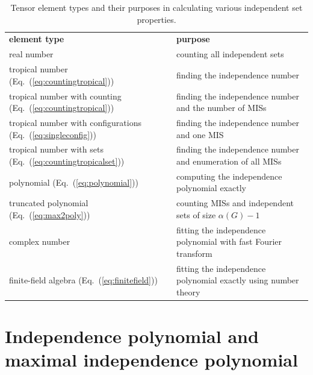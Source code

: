 \documentclass[onefignum, onetabnum]{siamart190516}
\newcommand{\<}{\langle}
\renewcommand{\>}{\rangle}
\newcommand{\Eq}[1]{Eq.~(\ref{#1})}
\newcommand{\ra}[1]{\renewcommand{\arraystretch}{#1}}
\begin{document}
\begin{table}[t!]\centering
\begin{minipage}{\columnwidth}
\ra{1.3}
        \begin{tabularx}{\textwidth}{bb}\toprule
            \hline
            \textbf{element type}     & \textbf{purpose} \\
            {real number}     & {counting all independent sets} \\
            {tropical number} (\Eq{eq:countingtropical})    & {finding the independence number} \\
            {tropical number with counting} (\Eq{eq:countingtropical})     & {finding the independence number and the number of MISs} \\
            {tropical number with configurations} (\Eq{eq:singleconfig})     & {finding the independence number and one MIS} \\
            {tropical number with sets} (\Eq{eq:countingtropicalset})    & {finding the independence number and enumeration of all MISs} \\
            {polynomial} (\Eq{eq:polynomial})     & {computing the independence polynomial exactly} \\
            {truncated polynomial} (\Eq{eq:max2poly})     & {counting MISs and independent sets of size $\alpha(G)-1$} \\
            {complex number}     & {fitting the independence polynomial with fast Fourier transform} \\
            {finite-field algebra (\Eq{eq:finitefield})} & {fitting the independence polynomial exactly using number theory} \\
            \bottomrule
        \end{tabularx}
    \caption{Tensor element types and their purposes in calculating various independent set properties.}\label{tbl:generictypes}
\end{minipage}
\end{table}

\section{Independence polynomial and maximal independence polynomial}
\end{document}
